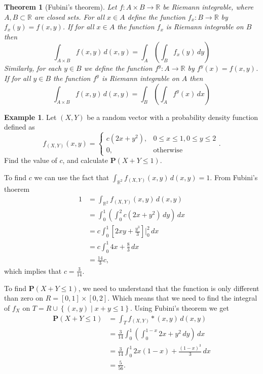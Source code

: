 \documentclass[11pt,a4paper]{article}
\theoremstyle{definition}
\newtheorem{example}{Example}[section]
\theoremstyle{plain}
\newtheorem{theorem}{Theorem}[section]
\newcommand{\R}{\mathbb{R}}
\newcommand{\Prob}{\mathbf{P}}
\newcommand{\set}[2]{ \left\{ #1 \mid #2 \right\} }
\begin{document}
  \begin{theorem}[Fubini's theorem]
    Let $f \colon A \times B \to \R$ be Riemann integrable, where 
    $A,B \subset \R$ are closed sets.
    For all $x \in A$ define the function $f_x \colon B \to \R$ by
    $f_x(y) = f(x,y)$.
    If for all $x \in A$ the function $f_x$ is Riemann integrable on $B$
    then
    \[
      \int_{A \times B} f(x,y)\,d(x,y) =
      \int_{A}\left(\int_{B} f_x(y)\,dy\right)
    \]
    Similarly, for each $y \in B$ we define the function 
    $f^y \colon A \to \R$ by $f^y(x) = f(x,y)$.
    If for all $y \in B$ the function $f^y$ is Riemann integrable on $A$
    then
    \[
      \int_{A \times B} f(x,y)\,d(x,y) =
      \int_{B}\left(\int_{A} f^y(x)\,dx\right)
    \]
  \end{theorem}
  \begin{example}
    Let $(X,Y)$ be a random vector with a probability density function
    defined as
    \[
      f_{(X,Y)}(x,y) =
      \begin{cases}
        c(2x+y^2), & 0 \le x \le 1, 0 \le y \le 2 \\
        0, &\text{otherwise}
      \end{cases}.
    \]
    Find the value of $c$, and calculate $\Prob(X + Y \le 1)$.

    To find $c$ we can use the fact that 
    $\int_{\R^2} f_{(X,Y)}(x,y)\,d(x,y) = 1$.
    From Fubini's thoerem
    \begin{align*}
      1 &= \int_{\R^2} f_{(X,Y)}(x,y)\,d(x,y) \\
      &= \int_{0}^{1}\left(\int_{0}^{2} c(2x + y^2)\,dy\right)\,dx \\
      &= c \int_{0}^{1} \left[2xy + \frac{y^3}{3}\right]\biggr\vert^2_0\,dx \\
      &= c \int_{0}^{1} 4x + \frac{8}{3}\,dx \\
      &= \frac{14}{3}c,
    \end{align*}
    which implies that $c = \frac{3}{14}$.

    To find $\Prob(X + Y \le 1)$, we need to understand that the function
    is only different than zero on $R = [0,1] \times [0,2]$. Which means that
    we need to find the integral of $f_X$ on 
    $T = R \cup \set{(x,y)}{x + y \le 1}$. 
    Using Fubini's theorem we get
    \begin{align*}
      \Prob(X + Y \le 1) &= \int_{T}f_{(X,Y)}*(x,y)\,d(x,y) \\
      &= \frac{3}{14} \int_{0}^{1} 
      \left(\int_{0}^{1-x} 2x + y^2\,dy\right)\,dx \\
      &= {\frac{3}{14}}\int_{0}^{1}2x(1-x)+{\frac{(1-x)^{3}}{3}}\,dx \\
      &= {\frac{5}{56}}.
    \end{align*}
  \end{example}
\end{document}
